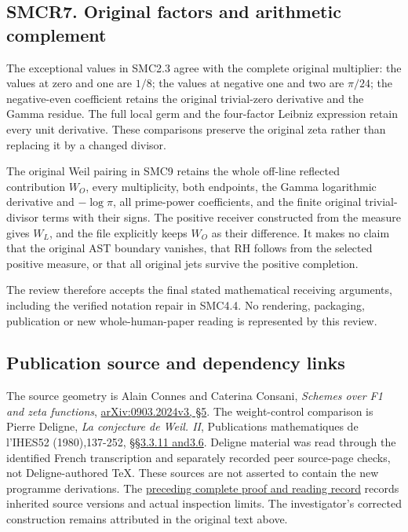 \subsection{SMCR7. Original factors and arithmetic
complement}\label{smcr7.-original-factors-and-arithmetic-complement}

The exceptional values in SMC2.3 agree with the complete original
multiplier: the values at zero and one are \(1/8\); the values at
negative one and two are \(\pi/24\); the negative-even coefficient
retains the original trivial-zero derivative and the Gamma residue. The
full local germ and the four-factor Leibniz expression retain every unit
derivative. These comparisons preserve the original zeta rather than
replacing it by a changed divisor.

The original Weil pairing in SMC9 retains the whole off-line reflected
contribution \(W_O\), every multiplicity, both endpoints, the Gamma
logarithmic derivative and \(-\log\pi\), all prime-power coefficients,
and the finite original trivial-divisor terms with their signs. The
positive receiver constructed from the measure gives \(W_L\), and the
file explicitly keeps \(W_O\) as their difference. It makes no claim
that the original AST boundary vanishes, that RH follows from the
selected positive measure, or that all original jets survive the
positive completion.

The review therefore accepts the final stated mathematical receiving
arguments, including the verified notation repair in SMC4.4. No
rendering, packaging, publication or new whole-human-paper reading is
represented by this review.

\subsection{Publication source and dependency
links}\label{publication-source-and-dependency-links}

The source geometry is Alain Connes and Caterina Consani, \emph{Schemes
over F1 and zeta functions},
\href{https://arxiv.org/abs/0903.2024v3}{arXiv:0903.2024v3, §5}. The
weight-control comparison is Pierre Deligne, \emph{La conjecture de
Weil. II}, Publications mathematiques de l'IHES52 (1980),137-252,
\href{https://www.numdam.org/item/PMIHES_1980__52__137_0/}{§§3.3.11
and3.6}. Deligne material was read through the identified French
transcription and separately recorded peer source-page checks, not
Deligne-authored TeX. These sources are not asserted to contain the new
programme derivations. The
\href{https://github.com/KokunoYumeto/zeta-function-research-reader/blob/36a82ecca98addb8a98b48204e349737856c7223/workbenches/splitzero-tandem/continuations/20260924-cohomology-weight-and-character-lifts/BUILD_AND_REVIEW.md}{preceding
complete proof and reading record} records inherited source versions and
actual inspection limits. The investigator's corrected construction
remains attributed in the original text above.
